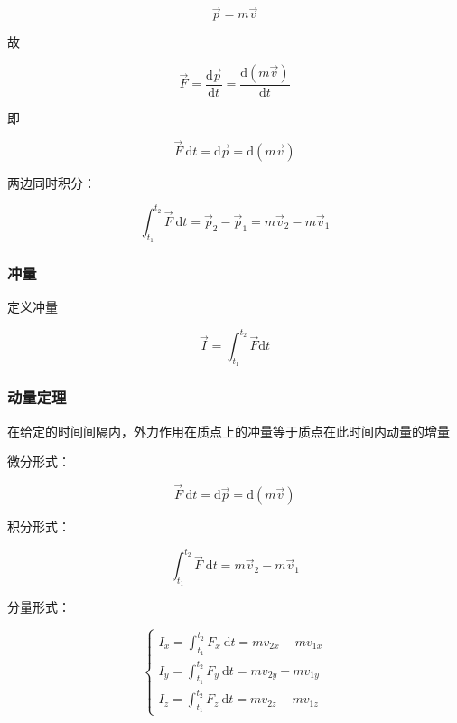 \documentclass[
	12pt, %
	a4paper, %
]{myLegrandOrangeBook}
\newcommand{\rmd}{\mathrm{d}}
\newcommand{\deriv}[2]{\frac{\rmd #1}{\rmd #2}}
\begin{document}
\begin{equation}
    \overrightarrow{p} = m\overrightarrow{v}
\end{equation}

故

\begin{equation}
    \overrightarrow{F} = \deriv{\overrightarrow{p}}{t} = \deriv{\left(m\overrightarrow{v}\right)}{t}
\end{equation}

即

$$
    \overrightarrow{F} \mathrm{~d} t=\mathrm{d} \overrightarrow{p}=\mathrm{d}(m \overrightarrow{v})
$$

两边同时积分：

$$
    \int_{t_1}^{t_2} \overrightarrow{F} \mathrm{~d} t=\overrightarrow{p}_2-\overrightarrow{p}_1=
    m \overrightarrow{v}_2-m \overrightarrow{v}_1
$$

\subsubsection{冲量}

定义冲量

\begin{equation}
    \overrightarrow{I} = \int_{t_1}^{t_2} \overrightarrow{F} \rmd t
\end{equation}

\subsubsection{动量定理}

在给定的时间间隔内，外力作用在质点上的冲量等于质点在此时间内动量的增量

微分形式：

\begin{equation}
    \overrightarrow{F} \mathrm{~d} t=\mathrm{d} \overrightarrow{p}=\mathrm{d}(m \overrightarrow{v})
\end{equation}

积分形式：

\begin{equation}
    \int_{t_1}^{t_2} \overrightarrow{F} \mathrm{~d} t = m \overrightarrow{v}_2-m \overrightarrow{v}_1
\end{equation}

分量形式：

\begin{equation}
    \left\{\begin{array}{l}
    I_x=\int_{t_1}^{t_2} F_x \mathrm{~d} t=m v_{2 x}-m v_{1 x} \\
    I_y=\int_{t_1}^{t_2} F_y \mathrm{~d} t=m v_{2 y}-m v_{1 y} \\
    I_z=\int_{t_1}^{t_2} F_z \mathrm{~d} t=m v_{2 z}-m v_{1 z}
    \end{array}\right.
\end{equation}
\end{document}
